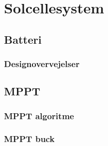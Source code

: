 \documentclass[../main.tex]{subfiles}
\begin{document}
\chapter{Solcellesystem} \label{Chap:Solcellesystem}

\section{Batteri}

\subsection{Designovervejelser}

\section{MPPT}

\subsection{}

\subsection{MPPT algoritme}

\subsection{MPPT buck}

\subsection{}

\subsection{}
\end{document}
